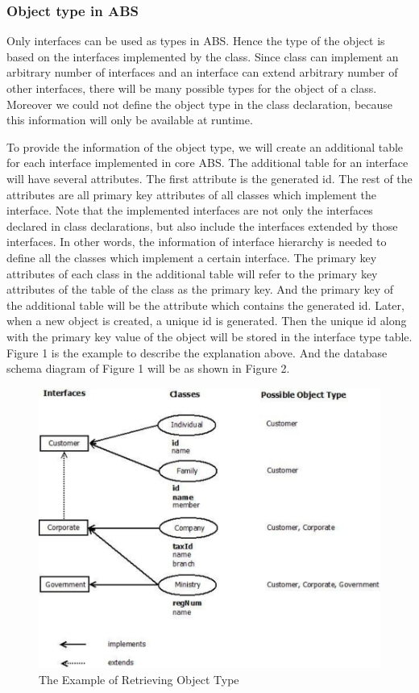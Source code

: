 \documentclass[conference]{IEEEtran}
\begin{document}
\subsubsection{Object type in ABS}
Only interfaces can be used as types in ABS. Hence the type of the object is based on the interfaces implemented by the class. Since class can implement an arbitrary number of interfaces and an interface can extend arbitrary number of other interfaces, there will be many possible types for the object of a class. Moreover we could not define the object type in the class declaration, because this information will only be available at runtime.

To provide the information of the object type, we will create an additional table for each interface implemented in core ABS. The additional table for an interface will have several attributes. The first attribute is the generated id. The rest of the attributes are all primary key attributes of all classes which implement the interface. Note that the implemented interfaces are not only the interfaces declared in class declarations, but also include the interfaces extended by those interfaces. In other words, the information of interface hierarchy is needed to define all the classes which implement a certain interface. The primary key attributes of each class in the additional table will refer to the primary key attributes of the table of the class as the primary key. And the primary key of the additional table will be the attribute which contains the generated id. Later, when a new object is created, a unique id is generated. Then the unique id along with the primary key value of the object will be stored in the interface type table. Figure 1 is the example to describe the explanation above. And the database schema diagram of Figure 1 will be as shown in Figure 2.

\begin{figure}
	\centering
	\includegraphics[scale=0.6]{sample.pdf}
	\caption{The Example of Retrieving Object Type}
	\label{figure1}
\end{figure}
\end{document}

